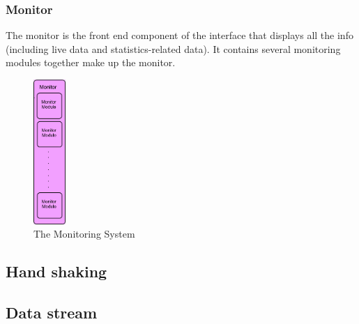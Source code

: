 \documentclass[a4paper]{article}
\begin{document}
\subsubsection{Monitor}
The monitor is the front end component of the interface that displays all the info (including live data and statistics-related data). It contains several monitoring modules together make up the monitor.

\begin{figure}[h!]
\centering
\includegraphics[height=55mm]{Monitor.png}
\caption{The Monitoring System}
\label{threadsVsSync}
\end{figure}

\subsection{Hand shaking}

\subsection{Data stream}
\end{document}
